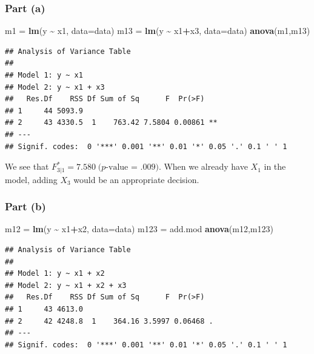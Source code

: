 \documentclass[
]{article}
\newenvironment{Shaded}{\begin{snugshade}}{\end{snugshade}}
\newcommand{\AttributeTok}[1]{\textcolor[rgb]{0.13,0.29,0.53}{#1}}
\newcommand{\FunctionTok}[1]{\textcolor[rgb]{0.13,0.29,0.53}{\textbf{#1}}}
\newcommand{\NormalTok}[1]{#1}
\newcommand{\OtherTok}[1]{\textcolor[rgb]{0.56,0.35,0.01}{#1}}
\newcommand{\SpecialCharTok}[1]{\textcolor[rgb]{0.81,0.36,0.00}{\textbf{#1}}}
\begin{document}
\hypertarget{part-a}{%
\subsubsection{Part (a)}\label{part-a}}

\begin{Shaded}
\begin{Highlighting}[]
\NormalTok{m1 }\OtherTok{=} \FunctionTok{lm}\NormalTok{(y }\SpecialCharTok{\textasciitilde{}}\NormalTok{ x1, }\AttributeTok{data=}\NormalTok{data)}
\NormalTok{m13 }\OtherTok{=} \FunctionTok{lm}\NormalTok{(y }\SpecialCharTok{\textasciitilde{}}\NormalTok{ x1}\SpecialCharTok{+}\NormalTok{x3, }\AttributeTok{data=}\NormalTok{data)}
\FunctionTok{anova}\NormalTok{(m1,m13)}
\end{Highlighting}
\end{Shaded}

\begin{verbatim}
## Analysis of Variance Table
## 
## Model 1: y ~ x1
## Model 2: y ~ x1 + x3
##   Res.Df    RSS Df Sum of Sq      F  Pr(>F)   
## 1     44 5093.9                               
## 2     43 4330.5  1    763.42 7.5804 0.00861 **
## ---
## Signif. codes:  0 '***' 0.001 '**' 0.01 '*' 0.05 '.' 0.1 ' ' 1
\end{verbatim}

We see that \(F_{3|1}^* = 7.580 \; \text{($p$-value = $.009$)}\). When
we already have \(X_1\) in the model, adding \(X_3\) would be an
appropriate decision.

\hypertarget{part-b}{%
\subsubsection{Part (b)}\label{part-b}}

\begin{Shaded}
\begin{Highlighting}[]
\NormalTok{m12 }\OtherTok{=} \FunctionTok{lm}\NormalTok{(y }\SpecialCharTok{\textasciitilde{}}\NormalTok{ x1}\SpecialCharTok{+}\NormalTok{x2, }\AttributeTok{data=}\NormalTok{data)}
\NormalTok{m123 }\OtherTok{=}\NormalTok{ add.mod}
\FunctionTok{anova}\NormalTok{(m12,m123)}
\end{Highlighting}
\end{Shaded}

\begin{verbatim}
## Analysis of Variance Table
## 
## Model 1: y ~ x1 + x2
## Model 2: y ~ x1 + x2 + x3
##   Res.Df    RSS Df Sum of Sq      F  Pr(>F)  
## 1     43 4613.0                              
## 2     42 4248.8  1    364.16 3.5997 0.06468 .
## ---
## Signif. codes:  0 '***' 0.001 '**' 0.01 '*' 0.05 '.' 0.1 ' ' 1
\end{verbatim}
\end{document}
